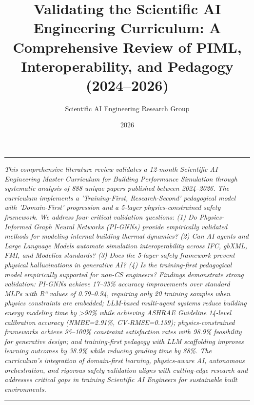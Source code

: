 \documentclass[12pt,a4paper]{article}
\renewenvironment{abstract}{%
  \vspace{8pt}
  \noindent\rule{\linewidth}{0.4pt}\vspace{4pt}
  \noindent{\bfseries Abstract.}\quad\itshape}
  {\par\vspace{4pt}\noindent\rule{\linewidth}{0.4pt}\vspace{8pt}}
\begin{document}
\title{\textbf{Validating the Scientific AI Engineering Curriculum: A Comprehensive Review of PIML, Interoperability, and Pedagogy (2024--2026)}}
\author{Scientific AI Engineering Research Group}
\date{2026}
\maketitle
\thispagestyle{fancy}
\begin{abstract}
This comprehensive literature review validates a 12-month Scientific AI Engineering Master Curriculum for Building Performance Simulation through systematic analysis of 888 unique papers published between 2024--2026. The curriculum implements a 'Training-First, Research-Second' pedagogical model with 'Domain-First' progression and a 5-layer physics-constrained safety framework. We address four critical validation questions: (1) Do Physics-Informed Graph Neural Networks (PI-GNNs) provide empirically validated methods for modeling internal building thermal dynamics? (2) Can AI agents and Large Language Models automate simulation interoperability across IFC, gbXML, FMI, and Modelica standards? (3) Does the 5-layer safety framework prevent physical hallucinations in generative AI? (4) Is the training-first pedagogical model empirically supported for non-CS engineers? Findings demonstrate strong validation: PI-GNNs achieve 17--35\% accuracy improvements over standard MLPs with R² values of 0.79--0.94, requiring only 20 training samples when physics constraints are embedded; LLM-based multi-agent systems reduce building energy modeling time by >90\% while achieving ASHRAE Guideline 14-level calibration accuracy (NMBE=2.91\%, CV-RMSE=0.139); physics-constrained frameworks achieve 95--100\% constraint satisfaction rates with 98.9\% feasibility for generative design; and training-first pedagogy with LLM scaffolding improves learning outcomes by 38.9\% while reducing grading time by 88\%. The curriculum's integration of domain-first learning, physics-aware AI, autonomous orchestration, and rigorous safety validation aligns with cutting-edge research and addresses critical gaps in training Scientific AI Engineers for sustainable built environments.
\end{abstract}
\end{document}
